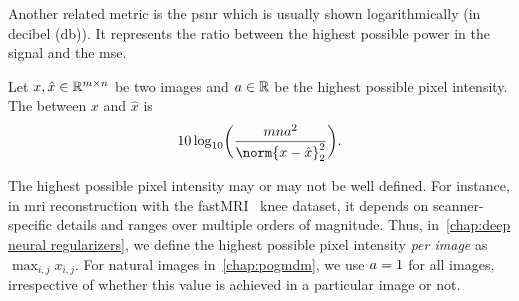 Another related metric is the \gls{psnr} which is usually shown logarithmically (in decibel (\unit{\decibel})).
It represents the ratio between the highest possible power in the signal and the \gls{mse}.
\begin{definition}%
	\label{def:psnr}
	Let \( x, \hat{x} \in \mathbb{R}^{m\times n} \) be two images and \( a \in \mathbb{R} \) be the highest possible pixel intensity.
	The \emph{} between \( x \) and \( \hat{x} \) is
	\begin{equation}
		\num{10}\log_{\num{10}} \biggl( \frac{\Height\Width \MaxIntensity^{\num{2}}}{\norm{x - \hat{x}}_{\num{2}}^{\num{2}}} \biggr).
\end{equation}
\end{definition}
The highest possible pixel intensity may or may not be well defined.
For instance, in \gls{mri} reconstruction with the fastMRI~\cite{zbontar_fastmri_2018} knee dataset, it depends on scanner-specific details and ranges over multiple orders of magnitude.
Thus, in~\cref{chap:deep neural regularizers}, we define the highest possible pixel intensity \emph{per image} as \( \max_{i,j} x_{i,j} \).
For natural images in~\cref{chap:pogmdm}, we use \(a = 1 \) for all images, irrespective of whether this value is achieved in a particular image or not.

